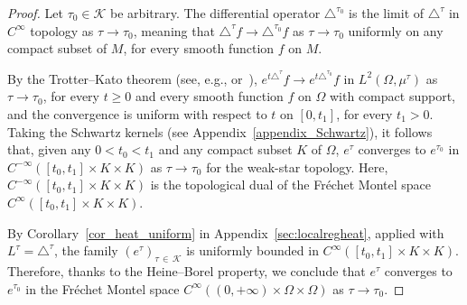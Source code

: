 \documentclass[10pt]{amsart}
\theoremstyle{definition}\newtheorem{defi}[theo]{Definition}\newtheorem{rema}[theo]{Remark}\newtheorem{exam}[theo]{Example}\newtheorem{exem}[theo]{Example}\newtheorem{nota}[theo]{Notation}
\newcommand{\calK}{\mathcal{K}}
\renewcommand{\geq}{\geqslant}
\begin{document}
\begin{proof}
Let $\tau_0\in\calK$ be arbitrary. The differential operator $\triangle^{\tau_0}$ is the limit of $\triangle^\tau$ in $C^\infty$ topology as $\tau\rightarrow\tau_0$, meaning that $\triangle^\tau f\rightarrow \triangle^{\tau_0} f$ as $\tau\rightarrow\tau_0$ uniformly on any compact subset of $M$, for every smooth function $f$ on $M$.

By the Trotter--Kato theorem (see, e.g., \cite[Chapter~III]{EngelNagel} or~\cite[Chapter~3]{Pazy}), $e^{t\triangle^\tau} f \rightarrow e^{t \triangle^{\tau_0}} f$ in $L^2(\Omega,\mu^\tau)$ as $\tau\rightarrow\tau_0$, for every $t\geq 0$ and every smooth function $f$ on $\Omega$ with compact support, and the convergence is uniform with respect to $t$ on $[0,t_1]$, for every $t_1>0$. Taking the Schwartz kernels (see Appendix~\ref{appendix_Schwartz}), it follows that, given any $0<t_0<t_1$ and any compact subset $K$ of $\Omega$, $e^\tau$ converges to $e^{\tau_0}$ in $C^{-\infty}([t_0,t_1]\times K\times K)$ as $\tau\rightarrow\tau_0$ for the weak-star topology. Here, $C^{-\infty}([t_0,t_1]\times K\times K)$ is the topological dual of the Fréchet Montel space $C^\infty([t_0,t_1]\times K\times K)$.

By Corollary~\ref{cor_heat_uniform} in Appendix~\ref{sec:localregheat}, applied with $L^\tau = \triangle^\tau$, the family $(e^\tau)_{\tau\,\in\,\calK}$ is uniformly bounded in $C^{\infty}([t_0,t_1]\times K\times K)$. Therefore, thanks to the Heine--Borel property, we conclude that $e^\tau$ converges to $e^{\tau_0}$ in the Fréchet Montel space $C^\infty((0,+\infty)\times\Omega\times\Omega)$ as $\tau\rightarrow\tau_0$.
\end{proof}
\end{document}
